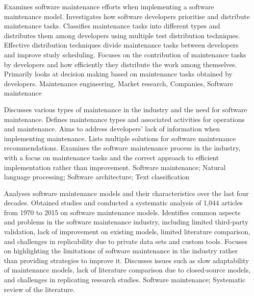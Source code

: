 {
    Examines software maintenance efforts when implementing a software maintenance model. Investigates how software developers prioritise and distribute maintenance tasks.
}
{
    Classifies maintenance tasks into different types and distributes them among developers using multiple test distribution techniques.
}
{
    Effective distribution techniques divide maintenance tasks between developers and improve study scheduling.
}
{
    Focuses on the contribution of maintenance tasks by developers and how efficiently they distribute the work among themselves. Primarily looks at decision making based on maintenance tasks obtained by developers.
}
{
    Maintenance engineering, Market research, Companies, Software maintenance
}

{
    Discusses various types of maintenance in the industry and the need for software maintenance. Defines maintenance types and associated activities for operations and maintenance.
}
{
    Aims to address developers' lack of information when implementing maintenance.
}
{
    Lists multiple solutions for software maintenance recommendations.
}
{
    Examines the software maintenance process in the industry, with a focus on maintenance tasks and the correct approach to efficient implementation rather than improvement.
}
{
    Software maintenance; Natural language processing; Software architecture; Text classification
}

{
    Analyses software maintenance models and their characteristics over the last four decades.
}
{
    Obtained studies and conducted a systematic analysis of 1,044 articles from 1970 to 2015 on software maintenance models.
}
{
    Identifies common aspects and problems in the software maintenance industry, including limited third-party validation, lack of improvement on existing models, limited literature comparison, and challenges in replicability due to private data sets and custom tools.
}
{
    Focuses on highlighting the limitations of software maintenance in the industry rather than providing strategies to improve it. Discusses issues such as slow adaptability of maintenance models, lack of literature comparison due to closed-source models, and challenges in replicating research studies.
}
{
    Software maintenance; Systematic review of the literature.
}

